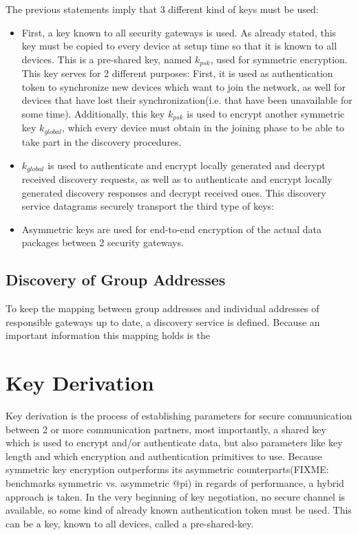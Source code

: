 The previous statements imply that 3 different kind of keys must be used:

\begin{itemize}
 \item First, a key known to all security gateways is used. As already stated, this key must be copied to every device at setup time so that it is known
 to all devices. This is a pre-shared key, named $k_{psk}$, used for symmetric encryption. This key serves for 2 different purposes: First, it is used as authentication token to 
 synchronize new devices which want to join the network, as well for devices that have lost their synchronization(i.e. that have been unavailable for some
 time). Additionally, this key $k_{psk}$ is used to encrypt another symmetric key $k_{global}$, which every device must obtain in the joining phase to be 
 able to take part in the discovery procedures. 
 \item $k_{global}$ is used to authenticate and encrypt locally generated and decrypt received discovery requests, as well as to authenticate and encrypt
 locally generated discovery responses and decrypt received ones. This discovery service datagrams securely transport the third type of keys:
 \item Asymmetric keys are used for end-to-end encryption of the actual data packages between 2 security gateways.
\end{itemize}



\subsection{Discovery of Group Addresses}

To keep the mapping between group addresses and individual addresses of responsible gateways up to date, a discovery service is defined. Because an important
information this mapping holds is the 

\section{Key Derivation}

Key derivation is the process of establishing parameters for secure communication between 2 or more communication partners, most importantly,
a shared key 
which is used to encrypt and/or authenticate data, but also parameters like key length and which encryption and authentication primitives to use.
Because symmetric key encryption outperforms its asymmetric counterparts(FIXME: benchmarks symmetric vs. asymmetric @pi) in regards of performance, a hybrid 
approach is taken. In the very beginning of key negotiation, no secure channel is available, so some kind of already known authentication token must be used.
This can be a key, known to all devices, called a pre-shared-key. 

